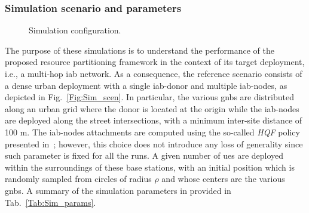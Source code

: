 \subsubsection{Simulation scenario and parameters}
\begin{figure}[t!]
  \centering
  \hfill
  \label{Float:Sim_scen_and_params}
  \caption{Simulation configuration.}
  \vspace{-.2cm}
\end{figure}
The purpose of these simulations is to understand the performance of the proposed resource partitioning framework in the context of its target deployment, i.e., a multi-hop \gls{iab} network. As a consequence, the reference scenario consists of a dense urban deployment with a single \gls{iab}-donor and multiple \gls{iab}-nodes, as depicted in Fig.~\ref{Fig:Sim_scen}. In particular, the various \glspl{gnb} are distributed along an urban grid where the donor is located at the origin while the \gls{iab}-nodes are deployed along the street intersections, with a minimum inter-site distance of 100 m. The \gls{iab}-nodes attachments are computed using the so-called \textit{HQF} policy presented in~\cite{polese2018iab}; however, this choice does not introduce any loss of generality since such parameter is fixed for all the runs. A given number of \glspl{ue} are deployed within the surroundings of these base stations, with an initial position which is randomly sampled from circles of radius $\rho$ and whose centers are the various \glspl{gnb}. A summary of the simulation parameters in provided in Tab.~\ref{Tab:Sim_params}.
